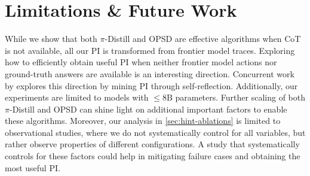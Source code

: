 \documentclass[]{servicenow} %
\begin{document}

\section{Limitations \& Future Work}

While we show that both $\pi$-Distill and OPSD are effective algorithms when CoT is not available, all our PI is transformed from frontier model traces. Exploring how to efficiently obtain useful PI when neither frontier model actions nor ground-truth answers are available is an interesting direction.  Concurrent work by \citet{hubotter2026reinforcementlearningselfdistillation} explores this direction by mining PI through self-reflection. Additionally, our experiments are limited to models with $\le8$B parameters. Further scaling of both $\pi$-Distill and OPSD can shine light on additional important factors to enable these algorithms. Moreover, our analysis in \cref{sec:hint-ablations} is limited to observational studies, where we do not systematically control for all variables, but rather observe properties of different configurations. A study that systematically controls for these factors could help in mitigating failure cases and obtaining the most useful PI.
\end{document}
